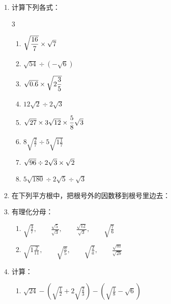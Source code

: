 \begin{enumerate}
\item 计算下列各式：
\begin{multicols}{3}
\begin{enumerate}
    \item $\sqrt{\dfrac{16}{7}}\times \sqrt{7}$
    \item $\sqrt{54}\div \left(-\sqrt{6}\right)$
    \item $\sqrt{0.6}\times \sqrt{2\dfrac{3}{5}}$
    \item $12\sqrt{2}\div 2\sqrt{3}$
    \item $\sqrt{27}\times 3\sqrt{12}\times \dfrac{5}{8}\sqrt{3}$
    \item $8\sqrt{\frac{2}{7}}\div 5\sqrt{1\frac{1}{7}}$
    \item $\sqrt{96}\div 2\sqrt{3}\times \sqrt{2}$
    \item $5\sqrt{180}\div 2\sqrt{5}\div \sqrt{3}$
\end{enumerate}
\end{multicols}

\item 在下列平方根中，把根号外的因数移到根号里边去：
\begin{enumerate}
\end{enumerate}

\item 有理化分母：
\begin{enumerate}
    \item $\sqrt{\frac{3}{7}},\qquad \frac{\sqrt{5}}{\sqrt{3}},\qquad \frac{\sqrt{12}}{\sqrt{3}},\qquad \sqrt{\frac{7}{6}}$
    \item $\sqrt{1\frac{2}{11}},\qquad \sqrt{\frac{a}{5}},\qquad \sqrt{\frac{2}{a}},\qquad \frac{\sqrt{m}}{\sqrt{2b}} $
\end{enumerate}

\item 计算：

    \begin{enumerate}
    \item $\sqrt{24}-\left(\sqrt{\frac{1}{2}}+2\sqrt{\frac{2}{3}}\right)-\left(\sqrt{\frac{1}{8}}-\sqrt{6}\right)$
\end{enumerate}




\end{enumerate}
